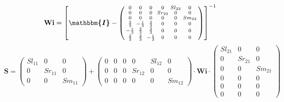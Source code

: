 \begin{equation} \mathbf{Wi} =  \left[ \boldsymbol{\mathbbm{I}}  -
\left(\begin{smallmatrix} 0 & 0 & 0 & 0 & Sl_{22} & 0 \\ 0 & 0 & 0 &
Sr_{22} & 0 & 0 \\ 0 & 0 & 0 & 0 & 0 & Sm_{22} \\ \frac{2}{3} &
-\frac{1}{3} & \frac{2}{3} & 0 & 0 & 0 \\ -\frac{1}{3} & \frac{2}{3} &
\frac{2}{3} & 0 & 0 & 0 \\ \frac{2}{3} & \frac{2}{3} & -\frac{1}{3} &
0 & 0 & 0 \end{smallmatrix}\right) \right]^{-1}  \end{equation}
\begin{equation} \mathbf{S} = \left(\begin{smallmatrix} Sl_{11} & 0 &
0 \\ 0 & Sr_{11} & 0 \\ 0 & 0 & Sm_{11} \end{smallmatrix}\right) +
\left(\begin{smallmatrix} 0 & 0 & 0 & 0 & Sl_{12} & 0 \\ 0 & 0 & 0 &
Sr_{12} & 0 & 0 \\ 0 & 0 & 0 & 0 & 0 & Sm_{12}
\end{smallmatrix}\right) \cdot \mathbf{Wi}
\cdot\left(\begin{smallmatrix} Sl_{21} & 0 & 0 \\ 0 & Sr_{21} & 0 \\ 0
& 0 & Sm_{21} \\ 0 & 0 & 0 \\ 0 & 0 & 0 \\ 0 & 0 & 0
\end{smallmatrix}\right) \end{equation}
